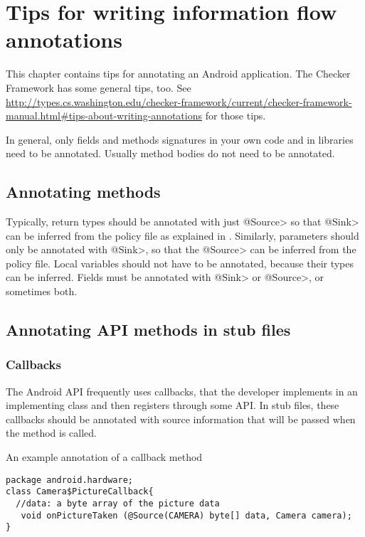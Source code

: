 \htmlhr
\chapter{Tips for writing information flow annotations\label{app-annotation}}

This chapter contains tips for annotating an Android application.  The Checker
Framework has some general tips, too.  See \url{http://types.cs.washington.edu/checker-framework/current/checker-framework-manual.html#tips-about-writing-annotations} for those tips.

In general, only fields and methods signatures in your own code and in
libraries need to be annotated. Usually method bodies do not need to be
annotated.


\section{Annotating  methods\label{sec:annomethods}}

Typically, return types should be annotated with just \<@Source> so that \<@Sink> can be
 inferred from the policy file as explained in . Similarly, parameters should
  only be annotated with  \<@Sink>, so that the \<@Source> can be inferred from  the policy file.
    Local variables should not have to be annotated, because their types can be inferred. Fields 
    must be annotated with   \<@Sink> or \<@Source>, or sometimes both. 

\section{Annotating API methods in stub files\label{sec:annoAPI}}

\subsection{Callbacks}
The Android API frequently uses callbacks, that the developer  
implements in an implementing class  and then registers through some API.
 In stub files, these callbacks should be annotated
with source information that will be passed when the method is called.  

An example annotation of a callback method
\begin{Verbatim}
package android.hardware;
class Camera$PictureCallback{
  //data: a byte array of the picture data
   void onPictureTaken (@Source(CAMERA) byte[] data, Camera camera);
}
\end{Verbatim}


